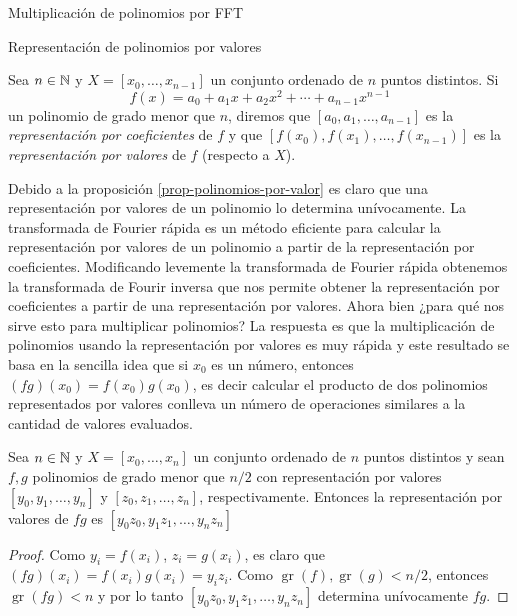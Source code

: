 \begin{chapter}{Multiplicación de polinomios por FFT}
\begin{section}{Representación de polinomios por valores}
  \begin{definicion}\label{def-representacion-por-valores-polinomio} Sea $n \in \mathbb N$ y $X = [x_0,\ldots,x_{n-1}]$  un conjunto ordenado de $n$ puntos distintos. Si
      $$
          f(x) = a_0 + a_1 x+ a_2 x^2 + \cdots  + a_{n-1}x^{n-1}
      $$
      un polinomio de grado menor que $n$, diremos que $[a_0,a_1,\ldots, a_{n-1}]$  es la \textit{representación por coeficientes} de $f$ y que $[f(x_0),f(x_1),\ldots,f(x_{n-1})]$ es la \textit{representación por valores} de $f$ (respecto a $X$).
  \end{definicion}

  Debido a la proposición \ref{prop-polinomios-por-valor} es claro que una representación por valores de un polinomio lo determina unívocamente. La transformada de Fourier rápida es un método eficiente para calcular la representación por valores de un polinomio a partir de la representación por coeficientes. Modificando levemente  la transformada de Fourier rápida obtenemos la transformada de Fourir inversa que nos permite obtener la representación por coeficientes a partir  de una representación por valores. Ahora bien ¿para qué nos sirve  esto para multiplicar polinomios? La respuesta es que la multiplicación de polinomios usando la representación por valores es muy rápida y este resultado se basa en la sencilla idea que si $x_0$ es un número,  entonces $(fg)(x_0) = f(x_0)g(x_0)$, es decir calcular el producto de dos polinomios representados por valores conlleva un número de operaciones similares a la cantidad de valores evaluados.

  \begin{proposicion} \label{prop-mult-por-valor} Sea $n \in \mathbb N$ y $X = [x_0,\ldots,x_{n}]$  un conjunto ordenado de $n$ puntos distintos y sean $f,g$ polinomios de grado menor que  $n/2$ con representación  por valores $[y_0,y_1,\ldots,y_{n}]$ y $[z_0,z_1,\ldots,z_{n}]$, respectivamente. Entonces la representación por valores de $fg$ es $[y_0z_0,y_1z_1,\ldots,y_{n}z_{n}]$
  \end{proposicion}
  \begin{proof}
      Como $y_i = f(x_i)$, $z_i = g(x_i)$,  es claro  que $(fg)(x_i) = f(x_i)g(x_i) = y_iz_i$. Como $\operatorname{gr}(f), \operatorname{gr}(g) < n/2$,  entonces $\operatorname{gr}(fg) < n$ y  por lo tanto $[y_0z_0,y_1z_1,\ldots,y_{n}z_{n}]$ determina unívocamente $fg$.
  \end{proof}


\end{section}
\end{chapter}
